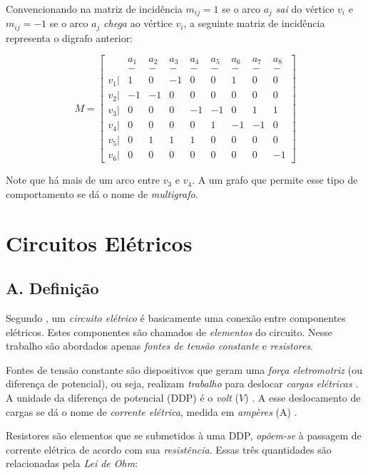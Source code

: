 \documentclass[twocolumn, 10pt]{extarticle}
\begin{document}
Convencionando na matriz de incidência $m_{ij} = 1$ se o arco $a_j$ \textit{sai} do vértice $v_i$ e $m_{ij} = -1$ se o arco $a_j$ \textit{chega} ao vértice $v_i$, a seguinte matriz de incidência representa o digrafo anterior:


\[
M = 
\begin{bmatrix}
 & a_1 & a_2 & a_3 & a_4 & a_5 & a_6 & a_7 & a_8 \\
 & - & - & - & - & - & - & - & - \\
 v_1 |& 1 & 0 & -1 & 0 & 0 & 1 & 0 & 0\\
 v_2 |& -1 & -1 & 0 & 0 & 0 & 0 & 0 & 0\\
 v_3 |& 0 & 0 & 0 & -1 & -1 & 0 & 1 & 1\\
 v_4 |& 0 & 0 & 0 & 0 & 1 & -1 & -1 & 0\\
 v_5 |& 0 & 1 & 1 & 1 & 0 & 0 & 0 & 0\\
 v_6 |& 0 & 0 & 0 & 0 & 0 & 0 & 0 & -1
\end{bmatrix}
\]

Note que há mais de um arco entre $v_3$ e $v_4$. A um grafo que permite esse tipo de comportamento se dá o nome de \textit{multigrafo}. 

\section{Circuitos Elétricos}

\subsection*{A. \quad Definição}

Segundo \cite[p. 4]{sadiku}, um \textit{circuito elétrico} é basicamente uma conexão entre componentes elétricos. Estes componentes são chamados de \textit{elementos} do circuito. Nesse trabalho são abordados apenas \textit{fontes de tensão constante} e \textit{resistores}.

Fontes de tensão constante são dispositivos que geram uma \textit{força eletromotriz} (ou diferença de potencial), ou seja, realizam \textit{trabalho} para deslocar \textit{cargas elétricas} \cite[p. 8]{sadiku}. A unidade da diferença de potencial (DDP) é o \textit{volt} ($V$) \cite[p. 9]{sadiku}. A esse deslocamento de cargas se dá o nome de \textit{corrente elétrica}, medida em \textit{ampères} (A) \cite[p. 6]{sadiku}.

Resistores são elementos que se submetidos à uma DDP, \textit{opõem-se} à passagem de corrente elétrica \cite[p. 28]{sadiku} de acordo com sua \textit{resistência}. Essas três quantidades são relacionadas pela \textit{Lei de Ohm}:
\end{document}
